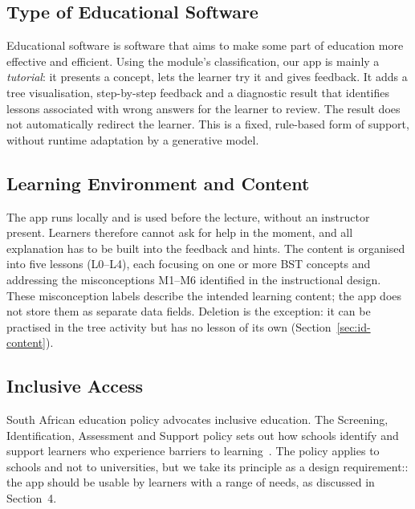 \subsection{Type of Educational Software}
Educational software is software that aims to make some part of education more effective and efficient. Using the module's classification, our app is mainly a \emph{tutorial}: it presents a concept, lets the learner try it and gives feedback. It adds a tree visualisation, step-by-step feedback and a diagnostic result that identifies lessons associated with wrong answers for the learner to review. The result does not automatically redirect the learner. This is a fixed, rule-based form of support, without runtime adaptation by a generative model.
 
\subsection{Learning Environment and Content}
The app runs locally and is used before the lecture, without an instructor present. Learners therefore cannot ask for help in the moment, and all explanation has to be built into the feedback and hints. The content is organised into five lessons (L0--L4), each focusing on one or more BST concepts and addressing the misconceptions M1--M6 identified in the instructional design. These misconception labels describe the intended learning content; the app does not store them as separate data fields. Deletion is the exception: it can be practised in the tree activity but has no lesson of its own (Section~\ref{sec:id-content}).
 
\subsection{Inclusive Access}
South African education policy advocates inclusive education. The Screening,
Identification, Assessment and Support policy sets out how schools identify
and support learners who experience barriers to learning~\cite{DBE2014}. The
policy applies to schools and not to universities, but we take its principle
as a design requirement:: the app should be usable by learners with a range of needs, as discussed in Section~4.